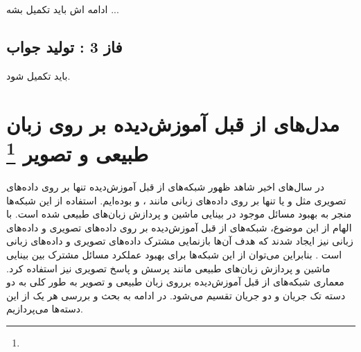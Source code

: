   ادامه اش باید تکمیل بشه ... 

\subsection{فاز 3 : تولید جواب}
باید تکمیل شود.

\section[مدل‌های از قبل آموزش‌دیده بر روی  زبان طبیعی و تصویر]{مدل‌های از قبل آموزش‌دیده بر روی  زبان طبیعی و تصویر \protect\footnote{}}
در سال‌های اخیر شاهد ظهور شبکه‌های از قبل آموزش‌دیده تنها بر روی داده‌های تصویری مثل 
\cite{he2016deep}
و یا تنها بر روی داده‌های زبانی مانند
\cite{devlin2018bert}
،
\cite{radford2019language}
و 
\cite{brown2020language}
بوده‌ایم. استفاده از این شبکه‌ها منجر به بهبود مسائل موجود در بینایی ماشین و پردازش زبان‌های طبیعی شده است. با الهام از این موضوع، شبکه‌های از قبل آموزش‌دیده بر روی داده‌های تصویری و داده‌های زبانی نیز ایجاد شدند که هدف آن‌ها بازنمایی مشترک داده‌های تصویری و داده‌های زبانی است . بنابراین می‌توان از این شبکه‌ها برای بهبود عملکرد مسائل مشترک بین بینایی ماشین و پردازش زبان‌های طبیعی مانند پرسش و پاسخ تصویری نیز استفاده کرد. معماری شبکه‌های از قبل آموزش‌دیده برروی زبان طبیعی و تصویر به طور کلی به دو دسته تک جریان و دو جریان تقسیم می‌شود. در ادامه به بحث و بررسی هر یک از این دسته‌ها می‌پردازیم.

